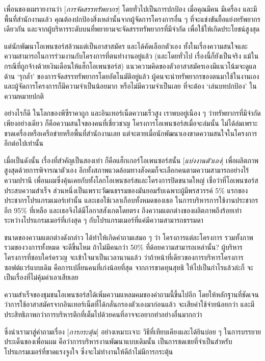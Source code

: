 เพื่อนของผมรายงานว่า {[}\emph{การจัดสรรทรัพยากร}{]}
โดยทั่วไปเป็นการปกป้อง เมื่อคุณมีคน มีเครื่อง และมีพื้นที่สำนักงานแล้ว
คุณต้องปกป้องสิ่งเหล่านั้นจากผู้จัดการโครงการอื่น ๆ
ที่จะแข่งขันยื้อแย่งทรัพยากรเดียวกัน
และจากผู้บริหารระดับบนที่พยายามจะจัดสรรทรัพยากรที่มีจำกัด
เพื่อใช้ให้เกิดประโยชน์สูงสุด

แต่นักพัฒนาโอเพนซอร์สล้วนแต่เป็นอาสาสมัคร และได้คัดเลือกตัวเอง
ทั้งในเรื่องความสนใจและความสามารถในการร่วมงานกับโครงการที่ตนทำงานอยู่แล้ว
(และโดยทั่วไป เรื่องนี้ก็ยังเป็นจริง
แม้ในกรณีที่ถูกจ้างด้วยเงินเดือนให้แฮ็กโอเพนซอร์ส)
แนวความคิดของตัวอาสาสมัครเองมีแนวโน้มจะดูแลด้าน `รุกล้ำ'
ของการจัดสรรทรัพยากรโดยอัตโนมัติอยู่แล้ว
ผู้คนจะนำทรัพยากรของตนมาใช้ในงานเอง
และผู้จัดการโครงการก็มีความจำเป็นน้อยมาก หรือไม่มีความจำเป็นเลย
ที่จะต้อง `เล่นบทปกป้อง' ในความหมายปกติ

อย่างไรก็ดี ในโลกของพีซีราคาถูก และอินเทอร์เน็ตความเร็วสูง
เราพบอยู่เนือง ๆ  ว่าทรัพยากรที่มีจำกัดเพียงอย่างเดียว
ก็คือความสนใจของคนที่เชี่ยวชาญ โครงการโอเพนซอร์สเมื่อจะล่มนั้น
ไม่ได้ล่มเพราะขาดเครื่องหรือเครือข่ายหรือพื้นที่สำนักงานเลย
แต่จะตายเมื่อนักพัฒนาเองขาดความสนใจในโครงการอีกต่อไปเท่านั้น

เมื่อเป็นดังนั้น เรื่องที่สำคัญเป็นสองเท่า ก็คือแฮ็กเกอร์โอเพนซอร์สนั้น
{[}\emph{แบ่งงานตัวเอง}{]} เพื่อผลิตภาพสูงสุดด้วยการพิจารณาตัวเอง
อีกทั้งสภาพแวดล้อมทางสังคมก็จะเลือกคนตามความสามารถอย่างไร้ความปรานี
เพื่อนผมซึ่งคุ้นเคยกับทั้งโลกโอเพนซอร์สและโครงการปิดขนาดใหญ่
เชื่อว่าที่โอเพนซอร์สประสบความสำเร็จ
ส่วนหนึ่งเป็นเพราะวัฒนธรรมของมันยอมรับเฉพาะผู้มีพรสวรรค์ 5\%
แรกของประชากรโปรแกรมเมอร์เท่านั้น และเธอใช้เวลาเกือบทั้งหมดของเธอ
ในการบริหารการใช้งานประชากรอีก 95\% ที่เหลือ
และเธอจึงได้มีโอกาสสังเกตโดยตรง ถึงความแตกต่างของผลิตภาพถึงร้อยเท่า
ระหว่างโปรแกรมเมอร์ที่เก่งสุด ๆ  กับโปรแกรมเมอร์ที่แค่มีความสามารถธรรมดา

ขนาดของความแตกต่างดังกล่าว ได้ทำให้เกิดคำถามเสมอ ๆ  ว่า
โครงการแต่ละโครงการ รวมทั้งภาพรวมของวงการทั้งหมด จะดีขึ้นไหม
ถ้าไม่มีคนกว่า 50\% ที่ด้อยความสามารถเหล่านั้น?
ผู้บริหารโครงการที่ชอบใคร่ครวญ จะเข้าใจมาเป็นเวลานานแล้ว
ว่าถ้าหน้าที่เดียวของการบริหารโครงการซอฟต์แวร์แบบเดิม
คือการเปลี่ยนคนที่เก่งน้อยที่สุด จากการขาดทุนสุทธิ
ให้ไปเป็นกำไรแล้วล่ะก็ จะเป็นเรื่องที่ไม่คุ้มค่าเอาเสียเลย

ความสำเร็จของชุมชนโอเพนซอร์สได้เพิ่มความแหลมคมของคำถามนี้ขึ้นไปอีก
โดยให้หลักฐานที่ชัดเจน
ว่าการใช้อาสาสมัครจากอินเทอร์เน็ตที่ได้กลั่นกรองตัวเองมาก่อนแล้ว
จะเสียค่าใช้จ่ายน้อยกว่า
และมีประสิทธิภาพกว่าการบริหารตึกที่เต็มไปด้วยคนที่อาจจะอยากทำอย่างอื่นมากกว่า

ซึ่งนำเรามาสู่คำถามเรื่อง {[}\emph{การกระตุ้น}{]} อย่างเหมาะเจาะ
วิธีที่เทียบเคียงและได้ยินบ่อย ๆ  ในการบรรยายประเด็นของเพื่อนผม
คือว่าการบริหารงานพัฒนาแบบเดิมนั้น
เป็นการชดเชยที่จำเป็นสำหรับโปรแกรมเมอร์ที่ขาดแรงจูงใจ
ซึ่งจะไม่ทำงานให้ดีถ้าไม่มีการกระตุ้น


